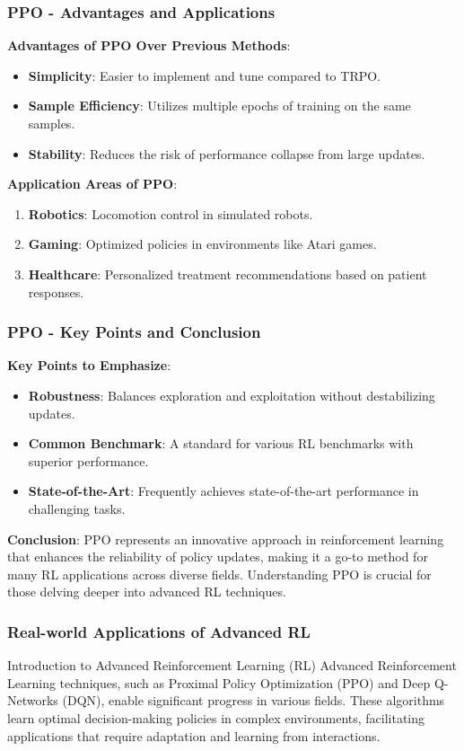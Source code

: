 \documentclass{beamer}
\begin{document}
\begin{frame}[fragile]
    \frametitle{PPO - Advantages and Applications}
    \textbf{Advantages of PPO Over Previous Methods}:
    \begin{itemize}
        \item \textbf{Simplicity}: Easier to implement and tune compared to TRPO.
        \item \textbf{Sample Efficiency}: Utilizes multiple epochs of training on the same samples.
        \item \textbf{Stability}: Reduces the risk of performance collapse from large updates.
    \end{itemize}

    \textbf{Application Areas of PPO}:
    \begin{enumerate}
        \item \textbf{Robotics}: Locomotion control in simulated robots.
        \item \textbf{Gaming}: Optimized policies in environments like Atari games.
        \item \textbf{Healthcare}: Personalized treatment recommendations based on patient responses.
    \end{enumerate}
\end{frame}

\begin{frame}[fragile]
    \frametitle{PPO - Key Points and Conclusion}
    \textbf{Key Points to Emphasize}:
    \begin{itemize}
        \item \textbf{Robustness}: Balances exploration and exploitation without destabilizing updates.
        \item \textbf{Common Benchmark}: A standard for various RL benchmarks with superior performance.
        \item \textbf{State-of-the-Art}: Frequently achieves state-of-the-art performance in challenging tasks.
    \end{itemize}
    
    \textbf{Conclusion}:
    PPO represents an innovative approach in reinforcement learning that enhances the reliability of policy updates, making it a go-to method for many RL applications across diverse fields. Understanding PPO is crucial for those delving deeper into advanced RL techniques.
\end{frame}

\begin{frame}[fragile]
    \frametitle{Real-world Applications of Advanced RL}
    \begin{block}{Introduction to Advanced Reinforcement Learning (RL)}
        Advanced Reinforcement Learning techniques, such as Proximal Policy Optimization (PPO) and Deep Q-Networks (DQN), enable significant progress in various fields. These algorithms learn optimal decision-making policies in complex environments, facilitating applications that require adaptation and learning from interactions.
    \end{block}
\end{frame}
\end{document}
